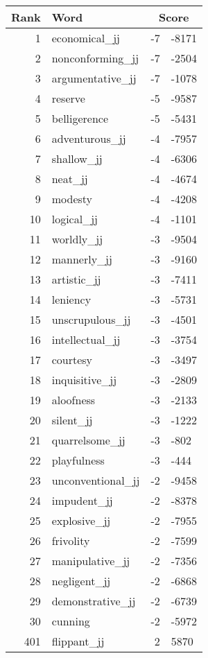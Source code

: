 \begin{longtable}[!htbp]{| rlr@{.}l |}
    \hline
    \textbf{Rank} & \textbf{Word} & \multicolumn{2}{c|}{\textbf{Score}} \\
    \hline
    \endhead
    1 & economical\_jj & -7 & -8171 \\
    2 & nonconforming\_jj & -7 & -2504 \\
    3 & argumentative\_jj & -7 & -1078 \\
    4 & reserve & -5 & -9587 \\
    5 & belligerence & -5 & -5431 \\
    6 & adventurous\_jj & -4 & -7957 \\
    7 & shallow\_jj & -4 & -6306 \\
    8 & neat\_jj & -4 & -4674 \\
    9 & modesty & -4 & -4208 \\
    10 & logical\_jj & -4 & -1101 \\
    11 & worldly\_jj & -3 & -9504 \\
    12 & mannerly\_jj & -3 & -9160 \\
    13 & artistic\_jj & -3 & -7411 \\
    14 & leniency & -3 & -5731 \\
    15 & unscrupulous\_jj & -3 & -4501 \\
    16 & intellectual\_jj & -3 & -3754 \\
    17 & courtesy & -3 & -3497 \\
    18 & inquisitive\_jj & -3 & -2809 \\
    19 & aloofness & -3 & -2133 \\
    20 & silent\_jj & -3 & -1222 \\
    21 & quarrelsome\_jj & -3 & -802 \\
    22 & playfulness & -3 & -444 \\
    23 & unconventional\_jj & -2 & -9458 \\
    24 & impudent\_jj & -2 & -8378 \\
    25 & explosive\_jj & -2 & -7955 \\
    26 & frivolity & -2 & -7599 \\
    27 & manipulative\_jj & -2 & -7356 \\
    28 & negligent\_jj & -2 & -6868 \\
    29 & demonstrative\_jj & -2 & -6739 \\
    30 & cunning & -2 & -5972 \\
    401 & flippant\_jj & 2 & 5870 \\

\end{longtable}
